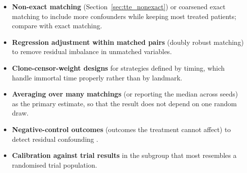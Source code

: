 \begin{itemize}
\item \textbf{Non-exact matching} (Section~\ref{sec:tte_nonexact}) or coarsened exact matching \cite{iacus2012} to include more confounders while keeping most treated patients; compare with exact matching.
\item \textbf{Regression adjustment within matched pairs} (doubly robust matching) to remove residual imbalance in unmatched variables.
\item \textbf{Clone-censor-weight designs} \cite{hernan2018duration} for strategies defined by timing, which handle immortal time properly rather than by landmark.
\item \textbf{Averaging over many matchings} (or reporting the median across seeds) as the primary estimate, so that the result does not depend on one random draw.
\item \textbf{Negative-control outcomes} (outcomes the treatment cannot affect) to detect residual confounding \cite{lipsitch2010}.
\item \textbf{Calibration against trial results} in the subgroup that most resembles a randomised trial population.
\end{itemize}

